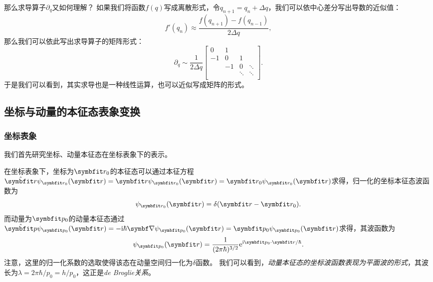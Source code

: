 \begin{tcolorbox}[breakable, colframe=purple, colback=red!10, title={\textbf{关于连续力学量的算符}}]
那么求导算子$\partial_q$又如何理解？
如果我们将函数$f(q)$写成离散形式，令$q_{n+1} = q_n + \Delta q$，我们可以依中心差分写出导数的近似值：
\begin{equation}
    f'(q_n) \approx \frac{f(q_{n+1})-f(q_{n-1})}{2\Delta q},
\end{equation}
那么我们可以依此写出求导算子的矩阵形式：
\begin{equation}
    \partial_q \sim \frac{1}{2\Delta q}
    \begin{bmatrix}
        0  &  1 \\
        -1 &  0 &  1    \\
           & -1 &  0    &\ddots \\
           &    &\ddots &\ddots \\
    \end{bmatrix}.
\end{equation}
于是我们可以看到，其实求导也是一种线性运算，也可以近似写成矩阵的形式。
\end{tcolorbox}


\subsection{\texorpdfstring{坐标与动量的本征态\quad 表象变换}{坐标与动量的本征态  表象变换}}
\label{subsec:cmr_eigen_rep_trans}

\subsubsection{坐标表象}

我们首先研究坐标、动量本征态在坐标表象下的表示。

在坐标表象下，坐标为$\rr_0$的本征态可以通过本征方程$\hat{\rr}\psi_{\rr_0}(\rr) = \rr\psi_{\rr_0}(\rr) = \rr_0 \psi_{\rr_0}(\rr)$求得，归一化的坐标本征态波函数为
\begin{equation}
    \psi_{\rr_0}(\rr) = \delta(\rr-\rr_0).
\end{equation}
而动量为$\pp_0$的动量本征态通过$\hat{\pp}\psi_{\pp_0}(\rr) = -\ii\hbar\del\psi_{\pp_0}(\rr) = \pp_0 \psi_{\pp_0}(\rr)$求得，其波函数为
\begin{equation}
    \psi_{\pp_0}(\rr) = \frac{1}{(2\pi\hbar)^{3/2}} \ee^{\ii\pp_0\cdot\rr/\hbar}.
\end{equation}
注意，这里的归一化系数的选取使得该态在动量空间归一化为$\delta$函数。
我们可以看到，\emph{动量本征态的坐标波函数表现为平面波的形式}，其波长为$\lambda=2\pi\hbar/p_0=h/p_0$，这正是\emph{de Broglie关系}。

